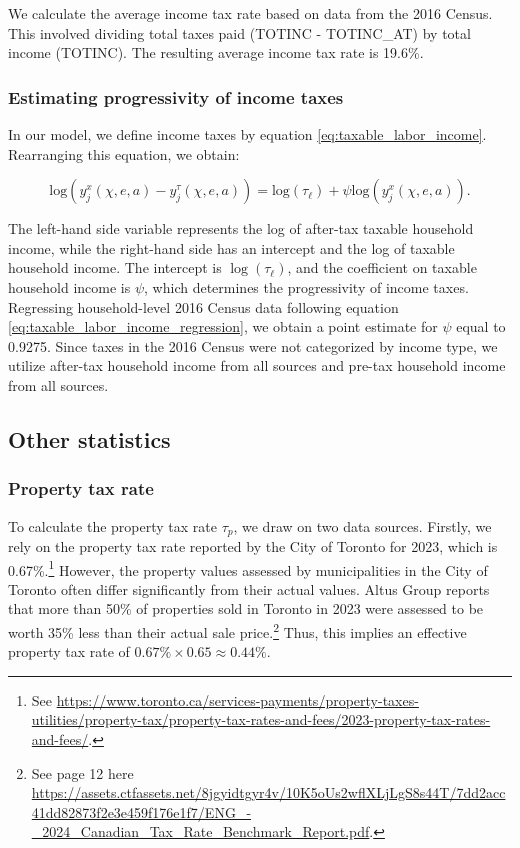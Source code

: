We calculate the average income tax rate based on data from the 2016 Census. This involved dividing total taxes paid (TOTINC - TOTINC\_AT) by total income (TOTINC). The resulting average income tax rate is 19.6\%.

\subsubsection{Estimating progressivity of income taxes}

In our model, we define income taxes by equation \eqref{eq:taxable_labor_income}. Rearranging this equation, we obtain:

\begin{equation}\label{eq:taxable_labor_income_regression}
  \mbox{log}(y^{x}_{j}(\chi,e,a)-y^{\tau}_{j}(\chi,e,a))=\mbox{log}(\tau_{\ell})+\psi \mbox{log}(y^{x}_{j}(\chi,e,a)).
\end{equation}

\noindent The left-hand side variable represents the log of after-tax taxable household income, while the right-hand side has an intercept and the log of taxable household income. The intercept is $\log(\tau_{\ell})$, and the coefficient on taxable household income is $\psi$, which determines the progressivity of income taxes. Regressing household-level 2016 Census data following equation \eqref{eq:taxable_labor_income_regression}, we obtain a point estimate for $\psi$ equal to 0.9275. Since taxes in the 2016 Census were not categorized by income type, we utilize after-tax household income from all sources and pre-tax household income from all sources.

\subsection{Other statistics}

\subsubsection{Property tax rate}

To calculate the property tax rate $\tau_p$, we draw on two data sources. Firstly, we rely on the property tax rate reported by the City of Toronto for 2023, which is 0.67\%.\footnote{See \url{https://www.toronto.ca/services-payments/property-taxes-utilities/property-tax/property-tax-rates-and-fees/2023-property-tax-rates-and-fees/}.} However, the property values assessed by municipalities in the City of Toronto often differ significantly from their actual values. Altus Group reports that more than 50\% of properties sold in Toronto in 2023 were assessed to be worth 35\% less than their actual sale price.\footnote{See page 12 here \url{https://assets.ctfassets.net/8jgyidtgyr4v/10K5oUs2wflXLjLgS8s44T/7dd2acc41dd82873f2e3e459f176e1f7/ENG_-_2024_Canadian_Tax_Rate_Benchmark_Report.pdf}.} Thus, this implies an effective property tax rate of $0.67\% \times 0.65 \approx 0.44\%$.

